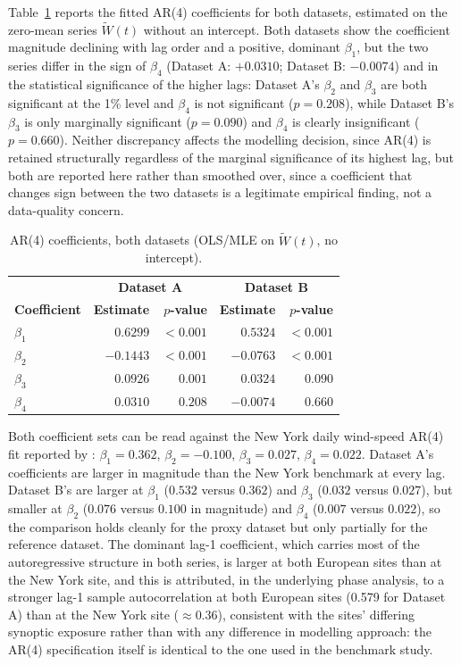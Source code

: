 Table~\ref{tab:ar4} reports the fitted AR(4) coefficients for both datasets, estimated on the zero-mean series $\widetilde W(t)$ without an intercept. Both datasets show the coefficient magnitude declining with lag order and a positive, dominant $\beta_1$, but the two series differ in the sign of $\beta_4$ (Dataset A: $+0.0310$; Dataset B: $-0.0074$) and in the statistical significance of the higher lags: Dataset A's $\beta_2$ and $\beta_3$ are both significant at the 1\% level and $\beta_4$ is not significant ($p = 0.208$), while Dataset B's $\beta_3$ is only marginally significant ($p = 0.090$) and $\beta_4$ is clearly insignificant ($p = 0.660$). Neither discrepancy affects the modelling decision, since AR(4) is retained structurally regardless of the marginal significance of its highest lag, but both are reported here rather than smoothed over, since a coefficient that changes sign between the two datasets is a legitimate empirical finding, not a data-quality concern.

\begin{table}[htbp]
\centering
\caption{AR(4) coefficients, both datasets (OLS/MLE on $\widetilde W(t)$, no intercept).}
\label{tab:ar4}
\begin{tabular}{l r r r r}
\toprule
& \multicolumn{2}{c}{\textbf{Dataset A}} & \multicolumn{2}{c}{\textbf{Dataset B}} \\
\textbf{Coefficient} & \textbf{Estimate} & \textbf{$p$-value} & \textbf{Estimate} & \textbf{$p$-value} \\
\midrule
$\beta_1$ & $0.6299$ & $<0.001$ & $0.5324$ & $<0.001$ \\
$\beta_2$ & $-0.1443$ & $<0.001$ & $-0.0763$ & $<0.001$ \\
$\beta_3$ & $0.0926$ & $0.001$ & $0.0324$ & $0.090$ \\
$\beta_4$ & $0.0310$ & $0.208$ & $-0.0074$ & $0.660$ \\
\bottomrule
\end{tabular}
\end{table}

Both coefficient sets can be read against the New York daily wind-speed AR(4) fit reported by \citet{AlexandridisZapranis2013}: $\beta_1=0.362$, $\beta_2=-0.100$, $\beta_3=0.027$, $\beta_4=0.022$. Dataset A's coefficients are larger in magnitude than the New York benchmark at every lag. Dataset B's are larger at $\beta_1$ ($0.532$ versus $0.362$) and $\beta_3$ ($0.032$ versus $0.027$), but smaller at $\beta_2$ ($0.076$ versus $0.100$ in magnitude) and $\beta_4$ ($0.007$ versus $0.022$), so the comparison holds cleanly for the proxy dataset but only partially for the reference dataset. The dominant lag-1 coefficient, which carries most of the autoregressive structure in both series, is larger at both European sites than at the New York site, and this is attributed, in the underlying phase analysis, to a stronger lag-1 sample autocorrelation at both European sites (0.579 for Dataset A) than at the New York site ($\approx 0.36$), consistent with the sites' differing synoptic exposure rather than with any difference in modelling approach: the AR(4) specification itself is identical to the one used in the benchmark study.

